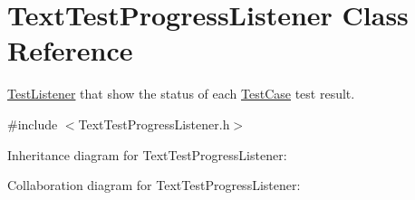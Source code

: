 \hypertarget{class_text_test_progress_listener}{\section{Text\+Test\+Progress\+Listener Class Reference}
\label{class_text_test_progress_listener}
}


\hyperlink{class_test_listener}{Test\+Listener} that show the status of each \hyperlink{class_test_case}{Test\+Case} test result.  




{\ttfamily \#include $<$Text\+Test\+Progress\+Listener.\+h$>$}



Inheritance diagram for Text\+Test\+Progress\+Listener\+:


Collaboration diagram for Text\+Test\+Progress\+Listener\+:
